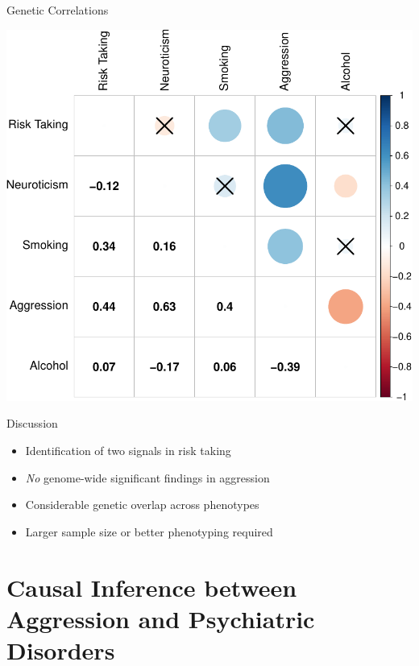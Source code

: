 \documentclass{beamer}
\begin{document}
\begin{frame}[t]{Genetic Correlations}
  \tiny
  \begin{center}
    \includegraphics[width=0.8\linewidth]{../ukb_assoc/figure/genetic_corr/gcorr_plot_circle_full_se.pdf}
  \end{center}
\end{frame}

\begin{frame}[t]{Discussion}
  \begin{itemize}
    \item Identification of two signals in risk taking
    \item \textit{No} genome-wide significant findings in aggression
    \item Considerable genetic overlap across phenotypes
    \item Larger sample size or better phenotyping required
  \end{itemize} 
\end{frame}

\section{Causal Inference between Aggression and Psychiatric Disorders}
\end{document}
